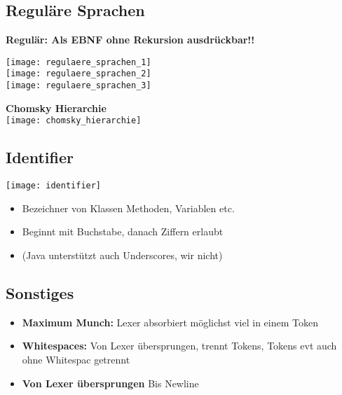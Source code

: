 \subsection{Reguläre Sprachen}
\textbf{Regulär: Als EBNF ohne Rekursion ausdrückbar!!}\\
\linebreak
\begin{minipage}{0,5\linewidth}
    \texttt{[image: regulaere\_sprachen\_1]}\\
    \texttt{[image: regulaere\_sprachen\_2]}\\
    \linebreak
    \texttt{[image: regulaere\_sprachen\_3]}
\end{minipage}
\begin{minipage}{0,5\linewidth}
    \textbf{Chomsky Hierarchie}\\
    \texttt{[image: chomsky\_hierarchie]}
\end{minipage}
\subsection{Identifier}
\begin{minipage}{0,4\linewidth}
    \texttt{[image: identifier]}
\end{minipage}
\begin{minipage}{0,6\linewidth}
    \begin{itemize}[topsep=0pt]
        \itemsep -0.2em
        \item Bezeichner von Klassen Methoden, Variablen etc.
        \item Beginnt mit Buchstabe, danach Ziffern erlaubt
        \item (Java unterstützt auch Underscores, wir nicht)
    \end{itemize}
\end{minipage}
\subsection{Sonstiges}
\begin{itemize}[topsep=0pt]
    \itemsep -0.2em
    \item \textbf{Maximum Munch:} Lexer absorbiert möglichst viel in einem Token
    \item \textbf{Whitespaces:} Von Lexer übersprungen, trennt Tokens, Tokens evt auch ohne Whitespac getrennt
    \item \textbf{Von Lexer übersprungen}
     Bis Newline
\end{itemize}

